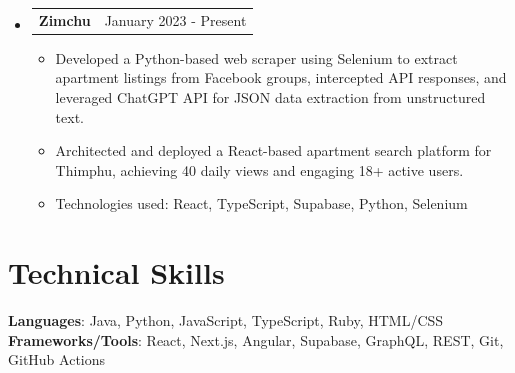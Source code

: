 \documentclass[letterpaper,11pt]{article}
\makeatletter
\newcommand{\resumeItem}[1]{
  \item\small{
    {#1 \vspace{-2pt}}
  }
}
\newcommand{\resumeProjectHeading}[2]{
    \item
    \begin{tabular*}{0.97\textwidth}{l@{\extracolsep{\fill}}r}
      \small#1 & #2 \\
    \end{tabular*}\vspace{-7pt}
}
\newcommand{\resumeSubHeadingListStart}{\begin{itemize}[leftmargin=0.15in, label={}]}
\newcommand{\resumeSubHeadingListEnd}{\end{itemize}}
\newcommand{\resumeItemListStart}{\begin{itemize}}
\newcommand{\resumeItemListEnd}{\end{itemize}\vspace{-5pt}}
\makeatother
\begin{document}
\resumeSubHeadingListStart

\resumeProjectHeading
          {\textbf{Zimchu}}{January 2023 - Present}
          \resumeItemListStart
            \resumeItem{Developed a Python-based web scraper using Selenium to extract apartment listings from Facebook groups, intercepted API responses, and leveraged ChatGPT API for JSON data extraction from unstructured text.}
            \resumeItem{Architected and deployed a React-based apartment search platform for Thimphu, achieving 40 daily views and engaging 18+ active users.}
            \resumeItem{Technologies used: React, TypeScript, Supabase, Python, Selenium}
          \resumeItemListEnd

    \resumeSubHeadingListEnd
\section{Technical Skills}
 \begin{itemize}[leftmargin=0.15in, label={}]
    \small{\item{
     \textbf{Languages}{: Java, Python, JavaScript, TypeScript, Ruby, HTML/CSS} \\
     \textbf{Frameworks/Tools}{: React, Next.js, Angular, Supabase, GraphQL, REST, Git, GitHub Actions} \\
    }}
 \end{itemize}
\end{document}
